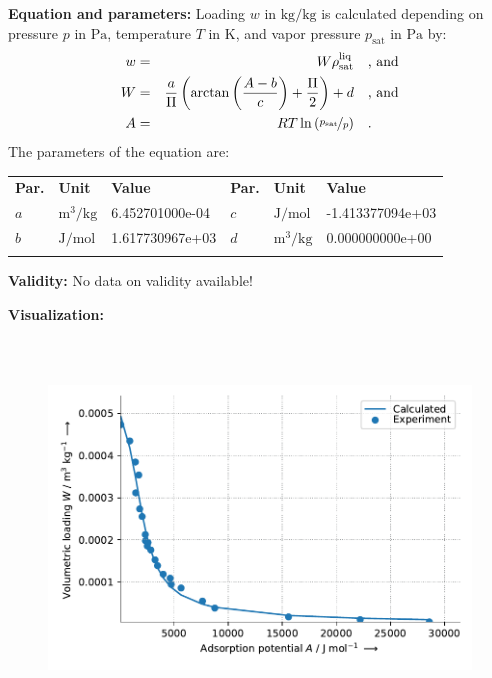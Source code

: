 \textbf{Equation and parameters:}
\newline
%
Loading $w$ in $\si{\kilogram\per\kilogram}$ is calculated depending on pressure $p$ in $\si{\pascal}$, temperature $T$ in $\si{\kelvin}$, and vapor pressure $p_\mathrm{sat}$ in $\si{\pascal}$ by:
%
\begin{equation*}
\begin{split}
w &=& W \rho_\mathrm{sat}^{\mathrm{liq}} & \quad\text{, and} \\
W &=& \frac{a}{\Pi} \left( \arctan \left( \frac{A - b}{c} \right) + \frac{\Pi}{2}\right) + d & \quad\text{, and} \\
A &=& R T \ln \left( \nicefrac{p_\mathrm{sat}}{p} \right) & \quad\text{.} \\
\end{split}
\end{equation*}
%
The parameters of the equation are:
%
\begin{longtable}[l]{lll|lll}
\toprule
\addlinespace
\textbf{Par.} & \textbf{Unit} & \textbf{Value} &	\textbf{Par.} & \textbf{Unit} & \textbf{Value} \\
\addlinespace
\midrule
\endhead

\bottomrule
\endfoot
\bottomrule
\endlastfoot
\addlinespace

$a$ & $\si{\cubic\meter\per\kilogram}$ & 6.452701000e-04 & $c$ & $\si{\joule\per\mole}$ & -1.413377094e+03 \\
$b$ & $\si{\joule\per\mole}$ & 1.617730967e+03 & $d$ & $\si{\cubic\meter\per\kilogram}$ & 0.000000000e+00 \\

\addlinespace\end{longtable}

\textbf{Validity:}
\newline
No data on validity available!
\newline

\textbf{Visualization:}
%
\begin{figure}[!htp]
{\noindent\includegraphics[height=10cm, keepaspectratio]{figs/ads/ads_Water_silica_gel_pellet_AF-25_DubininArctan1_1.pdf}}
\end{figure}
%

